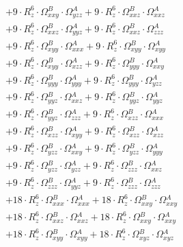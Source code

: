 \documentclass{article}
\begin{document}
\begin{subequations}
\begin{gather}
\begin{array}{c}
 \\[0.2em] 		 + 9 \cdot R_{z}^{6} \cdot \Omega{}^{B}_{xxy} \cdot \Omega{}^{A}_{yzz}+ 9 \cdot R_{z}^{6} \cdot \Omega{}^{B}_{xxz} \cdot \Omega{}^{A}_{xxz} 
 \\[0.2em] 		 + 9 \cdot R_{z}^{6} \cdot \Omega{}^{B}_{xxz} \cdot \Omega{}^{A}_{yyz}+ 9 \cdot R_{z}^{6} \cdot \Omega{}^{B}_{xxz} \cdot \Omega{}^{A}_{zzz} 
 \\[0.2em] 		 + 9 \cdot R_{z}^{6} \cdot \Omega{}^{B}_{xyy} \cdot \Omega{}^{A}_{xxx}+ 9 \cdot R_{z}^{6} \cdot \Omega{}^{B}_{xyy} \cdot \Omega{}^{A}_{xyy} 
 \\[0.2em] 		 + 9 \cdot R_{z}^{6} \cdot \Omega{}^{B}_{xyy} \cdot \Omega{}^{A}_{xzz}+ 9 \cdot R_{z}^{6} \cdot \Omega{}^{B}_{yyy} \cdot \Omega{}^{A}_{xxy} 
 \\[0.2em] 		 + 9 \cdot R_{z}^{6} \cdot \Omega{}^{B}_{yyy} \cdot \Omega{}^{A}_{yyy}+ 9 \cdot R_{z}^{6} \cdot \Omega{}^{B}_{yyy} \cdot \Omega{}^{A}_{yzz} 
 \\[0.2em] 		 + 9 \cdot R_{z}^{6} \cdot \Omega{}^{B}_{yyz} \cdot \Omega{}^{A}_{xxz}+ 9 \cdot R_{z}^{6} \cdot \Omega{}^{B}_{yyz} \cdot \Omega{}^{A}_{yyz} 
 \\[0.2em] 		 + 9 \cdot R_{z}^{6} \cdot \Omega{}^{B}_{yyz} \cdot \Omega{}^{A}_{zzz}+ 9 \cdot R_{z}^{6} \cdot \Omega{}^{B}_{xzz} \cdot \Omega{}^{A}_{xxx} 
 \\[0.2em] 		 + 9 \cdot R_{z}^{6} \cdot \Omega{}^{B}_{xzz} \cdot \Omega{}^{A}_{xyy}+ 9 \cdot R_{z}^{6} \cdot \Omega{}^{B}_{xzz} \cdot \Omega{}^{A}_{xzz} 
 \\[0.2em] 		 + 9 \cdot R_{z}^{6} \cdot \Omega{}^{B}_{yzz} \cdot \Omega{}^{A}_{xxy}+ 9 \cdot R_{z}^{6} \cdot \Omega{}^{B}_{yzz} \cdot \Omega{}^{A}_{yyy} 
 \\[0.2em] 		 + 9 \cdot R_{z}^{6} \cdot \Omega{}^{B}_{yzz} \cdot \Omega{}^{A}_{yzz}+ 9 \cdot R_{z}^{6} \cdot \Omega{}^{B}_{zzz} \cdot \Omega{}^{A}_{xxz} 
 \\[0.2em] 		 + 9 \cdot R_{z}^{6} \cdot \Omega{}^{B}_{zzz} \cdot \Omega{}^{A}_{yyz}+ 9 \cdot R_{z}^{6} \cdot \Omega{}^{B}_{zzz} \cdot \Omega{}^{A}_{zzz} 
 \\[0.2em] 		 + 18 \cdot R_{z}^{6} \cdot \Omega{}^{B}_{xxx} \cdot \Omega{}^{A}_{xxx}+ 18 \cdot R_{z}^{6} \cdot \Omega{}^{B}_{xxy} \cdot \Omega{}^{A}_{xxy} 
 \\[0.2em] 		 + 18 \cdot R_{z}^{6} \cdot \Omega{}^{B}_{xxz} \cdot \Omega{}^{A}_{xxz}+ 18 \cdot R_{z}^{6} \cdot \Omega{}^{B}_{xxy} \cdot \Omega{}^{A}_{xxy} 
 \\[0.2em] 		 + 18 \cdot R_{z}^{6} \cdot \Omega{}^{B}_{xyy} \cdot \Omega{}^{A}_{xyy}+ 18 \cdot R_{z}^{6} \cdot \Omega{}^{B}_{xyz} \cdot \Omega{}^{A}_{xyz} 

\end{array}
\end{gather}
\end{subequations}
\end{document}
